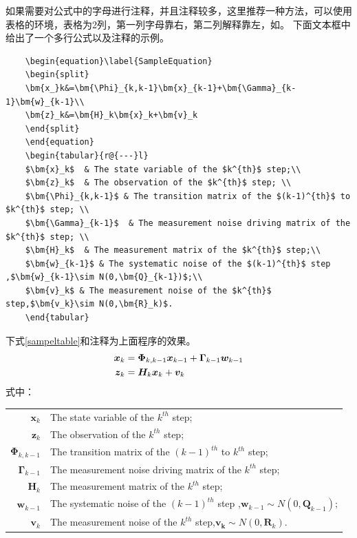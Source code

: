 \begin{spacing}{1.5}
	如果需要对公式中的字母进行注释，并且注释较多，这里推荐一种方法，可以使用表格的环境，表格为2列，第一列字母靠右，第二列解释靠左，如。 
	下面文本框中给出了一个多行公式以及注释的示例。
	\begin{lstlisting}
	\begin{equation}\label{SampleEquation}
	\begin{split}
	\bm{x_}k&=\bm{\Phi}_{k,k-1}\bm{x}_{k-1}+\bm{\Gamma}_{k-1}\bm{w}_{k-1}\\
	\bm{z}_k&=\bm{H}_k\bm{x}_k+\bm{v}_k
	\end{split}
	\end{equation}
	\begin{tabular}{r@{---}l}
	$\bm{x}_k$  & The state variable of the $k^{th}$ step;\\
	$\bm{z}_k$  & The observation of the $k^{th}$ step; \\
	$\bm{\Phi}_{k,k-1}$ & The transition matrix of the $(k-1)^{th}$ to $k^{th}$ step; \\
	$\bm{\Gamma}_{k-1}$  & The measurement noise driving matrix of the $k^{th}$ step; \\
	$\bm{H}_k$  & The measurement matrix of the $k^{th}$ step;\\
	$\bm{w}_{k-1}$ & The systematic noise of the $(k-1)^{th}$ step ,$\bm{w}_{k-1}\sim N(0,\bm{Q}_{k-1})$;\\
	$\bm{v}_k$ & The measurement noise of the $k^{th}$ step,$\bm{v_k}\sim N(0,\bm{R}_k)$.
	\end{tabular}
	\end{lstlisting}
	下式\ref{sampeltable}和注释为上面程序的效果。
	\begin{equation}\label{SampleEquation}
	\begin{split}
	\bm{x_}k&=\bm{\Phi}_{k,k-1}\bm{x}_{k-1}+\bm{\Gamma}_{k-1}\bm{w}_{k-1}\\
	\bm{z}_k&=\bm{H}_k\bm{x}_k+\bm{v}_k
	\end{split}
	\end{equation}
	式中：
	\begin{tabular}{r@{---}l}
		$\bm{x}_k$  & The state variable of the $k^{th}$ step;\\
		$\bm{z}_k$  & The observation of the $k^{th}$ step; \\
		$\bm{\Phi}_{k,k-1}$ & The transition matrix of the $(k-1)^{th}$ to $k^{th}$ step; \\
		$\bm{\Gamma}_{k-1}$  & The measurement noise driving matrix of the $k^{th}$ step; \\
		$\bm{H}_k$  & The measurement matrix of the $k^{th}$ step;\\
		$\bm{w}_{k-1}$ & The systematic noise of the $(k-1)^{th}$ step ,$\bm{w}_{k-1}\sim N(0,\bm{Q}_{k-1})$;\\
		$\bm{v}_k$ & The measurement noise of the $k^{th}$ step,$\bm{v_k}\sim N(0,\bm{R}_k)$.
	\end{tabular}
	

\end{spacing}
